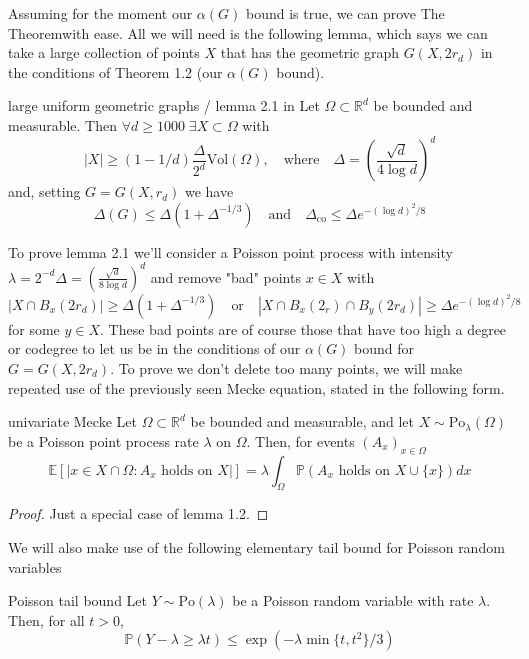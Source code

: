\documentclass{article}
\begin{document}
Assuming for the moment our $\alpha(G)$ bound is true, we can prove The Theorem\texttrademark with ease. All we will 
need is the following lemma, which says we can take a large collection of points $X$ that has the geometric 
graph $G(X, 2r_d)$ in the conditions of Theorem 1.2 (our $\alpha(G)$ bound). 

\begin{lemma}[]{large uniform geometric graphs / lemma 2.1 in \cite{campos2023}}
    Let $\Omega \subset \mathbb{R}^d$ be bounded and measurable. Then $\forall d \geq 1000 \; \exists X \subset \Omega$ 
    with \[|X| \geq (1-1/d)\frac{\Delta}{2^d}\text{Vol}(\Omega), \quad \text{where} \quad \Delta = 
    \left(\frac{\sqrt{d}}{4\log d}\right)^d\] and, setting $G = G(X, r_d)$ we have 
    \[\Delta(G) \leq \Delta(1 + \Delta^{-1/3}) \quad \text{and} \quad \Delta_\text{co} \leq \Delta e^{-(\log d)^2/8}\]
\end{lemma}

To prove lemma 2.1 we'll consider a Poisson point process with intensity $\lambda=2^{-d}\Delta=
\left(\frac{\sqrt{d}}{8\log d}\right)^d$ and remove "bad" points $x \in X$ with 
\[|X \cap B_x(2r_d)| \geq \Delta(1+\Delta^{-1/3}) \quad \text{or} \quad |X \cap B_x(2_r) \cap B_y(2r_d)| \geq 
\Delta e^{-(\log d)^2/8} \tag{$\heartsuit$}\] for some $y \in X$. These bad points are of course those that have too high a degree 
or codegree to let us be in the conditions of our $\alpha(G)$ bound for $G = G(X, 2r_d)$. To prove we don't delete 
too many points, we will make repeated use of the previously seen Mecke equation, stated in the following form. 

\begin{lemma}[]{univariate Mecke}
    Let $\Omega \subset \mathbb{R}^d$ be bounded and measurable, and let $X \sim \text{Po}_\lambda(\Omega)$ be a
    Poisson point process rate $\lambda$ on $\Omega$. Then, for events $(A_x)_{x \in \Omega}$ 
    \[\mathbb{E}[|x \in X \cap \Omega :  A_x \text{ holds on } X|] = \lambda\int_\Omega \mathbb{P}(A_x \text{ holds on } X \cup \{x\})dx\]
\end{lemma}

\begin{proof}
    Just a special case of lemma 1.2.
\end{proof}

We will also make use of the following elementary tail bound for Poisson random variables

\begin{lemma}[]{Poisson tail bound}
    Let $Y \sim \text{Po}(\lambda)$ be a Poisson random variable with rate $\lambda$. Then, for all $t > 0$,
    \[\mathbb{P}(Y - \lambda \geq \lambda t) \leq \exp(-\lambda\min\{t, t^2\}/3)\]
\end{lemma}
\end{document}
